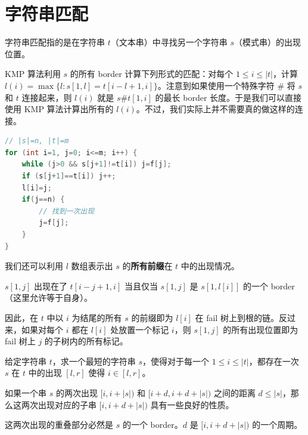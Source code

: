 \section{字符串匹配}

字符串匹配指的是在字符串 $t$（文本串）中寻找另一个字符串 $s$（模式串）的出现位置。

KMP 算法利用 $s$ 的所有 border 计算下列形式的匹配：对每个 $1\le i\le |t|$，计算 $l(i)=\max\{l:s[1,l]=t[i-l+1,i]\}$。注意到如果使用一个特殊字符 $\#$ 将 $s$ 和 $t$ 连接起来，则 $l(i)$ 就是 $s\#t[1,i]$ 的最长 border 长度。于是我们可以直接使用 KMP 算法计算出所有的 $l(i)$。不过，我们实际上并不需要真的做这样的连接。
\begin{lstlisting}[language=C++]
// |s|=n, |t|=m
for (int i=1, j=0; i<=m; i++) {
    while (j>0 && s[j+1]!=t[i]) j=f[j];
    if (s[j+1]==t[i]) j++;
    l[i]=j;
    if(j==n) {
        // 找到一次出现
        j=f[j];
    }
}
\end{lstlisting}

我们还可以利用 $l$ 数组表示出 $s$ 的\textbf{所有前缀}在 $t$ 中的出现情况。
\begin{lemma}
    $s[1,j]$ 出现在了 $t[i-j+1,i]$ 当且仅当 $s[1,j]$ 是 $s[1,l[i]]$ 的一个 border（这里允许等于自身）。
\end{lemma}

因此，在 $t$ 中以 $i$ 为结尾的所有 $s$ 的前缀即为 $l[i]$ 在 fail 树上到根的链。反过来，如果对每个 $i$ 都在 $l[i]$ 处放置一个标记 $i$，则 $s[1,j]$ 的所有出现位置即为 fail 树上 $j$ 的子树内的所有标记。

\begin{exercise}[P3426]
    给定字符串 $t$，求一个最短的字符串 $s$，使得对于每一个 $1\le i\le |t|$，都存在一次 $s$ 在 $t$ 中的出现 $[l,r]$ 使得 $i\in [l,r]$。
\end{exercise}

如果一个串 $s$ 的两次出现 $[i,i+|s|)$ 和 $[i+d,i+d+|s|)$ 之间的距离 $d\le |s|$，那么这两次出现对应的子串 $[i,i+d+|s|)$ 具有一些良好的性质。

\begin{fact}
    这两次出现的重叠部分必然是 $s$ 的一个 border。$d$ 是 $[i,i+d+|s|)$ 的一个周期。
\end{fact}

